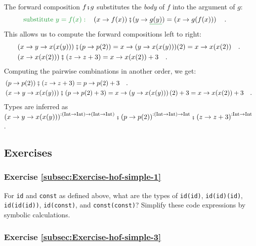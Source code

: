 The forward composition $f\bef g$ substitutes the \emph{body} of
$f$ into the argument of $g$:
\begin{align*}
{\color{greenunder}\text{substitute }y=f(x):}\quad & \left(x\rightarrow f(x)\right)\bef(y\rightarrow\gunderline{g(y)})=\left(x\rightarrow g(f(x))\right)\quad.
\end{align*}
This allows us to compute the forward compositions left to right:
\begin{align*}
 & \left(x\rightarrow y\rightarrow x(x(y))\right)\bef(p\rightarrow p(2))=x\rightarrow(y\rightarrow x(x(y)))(2)=x\rightarrow x(x(2))\quad.\\
 & \left(x\rightarrow x(x(2))\right)\bef\left(z\rightarrow z+3\right)=x\rightarrow x(x(2))+3\quad.
\end{align*}
Computing the pairwise combinations in another order, we get:
\begin{align*}
 & \left(p\rightarrow p(2)\right)\bef\left(z\rightarrow z+3\right)=p\rightarrow p(2)+3\quad.\\
 & \left(x\rightarrow y\rightarrow x(x(y))\right)\bef\left(p\rightarrow p(2)+3\right)=x\rightarrow\left(y\rightarrow x(x(y))\right)(2)+3=x\rightarrow x(x(2))+3\quad.
\end{align*}
Types are inferred as $\left(x\rightarrow y\rightarrow x(x(y))\right)^{:(\text{Int}\rightarrow\text{Int})\rightarrow(\text{Int}\rightarrow\text{Int})}\bef\left(p\rightarrow p(2)\right)^{:(\text{Int}\rightarrow\text{Int})\rightarrow\text{Int}}\bef\left(z\rightarrow z+3\right)^{:\text{Int}\rightarrow\text{Int}}$.

\subsection{Exercises}

\subsubsection{Exercise \label{subsec:Exercise-hof-simple-1}\ref{subsec:Exercise-hof-simple-1}}

For \lstinline!id! and \lstinline!const! as defined above, what
are the types of \lstinline!id(id)!, \lstinline!id(id)(id)!, \lstinline!id(id(id))!,
\lstinline!id(const)!, and \lstinline!const(const)!? Simplify these
code expressions by symbolic calculations.

\subsubsection{Exercise \label{subsec:Exercise-hof-simple-3}\ref{subsec:Exercise-hof-simple-3}}

